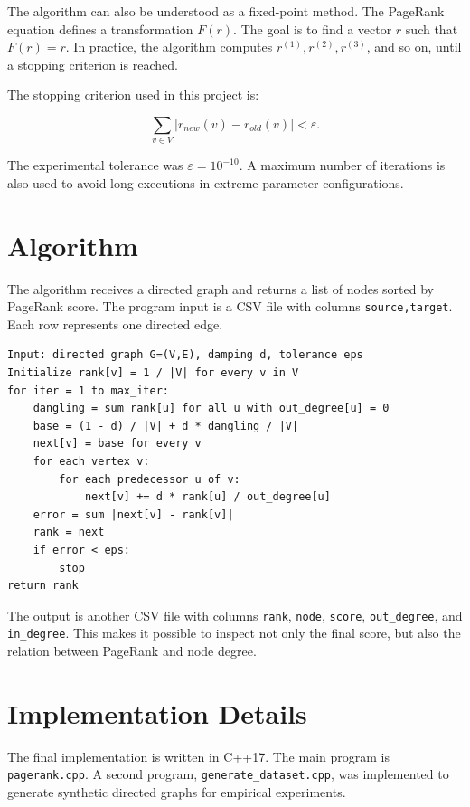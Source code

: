 \documentclass[runningheads]{llncs}
\begin{document}
The algorithm can also be understood as a fixed-point method. The PageRank equation defines a transformation \(F(r)\). The goal is to find a vector \(r\) such that \(F(r)=r\). In practice, the algorithm computes \(r^{(1)}, r^{(2)}, r^{(3)}\), and so on, until a stopping criterion is reached.

The stopping criterion used in this project is:

\begin{equation}
\sum_{v\in V}|r_{new}(v)-r_{old}(v)|<\varepsilon.
\end{equation}

The experimental tolerance was \(\varepsilon=10^{-10}\). A maximum number of iterations is also used to avoid long executions in extreme parameter configurations.

\section{Algorithm}

The algorithm receives a directed graph and returns a list of nodes sorted by PageRank score. The program input is a CSV file with columns \texttt{source,target}. Each row represents one directed edge.

\begin{verbatim}
Input: directed graph G=(V,E), damping d, tolerance eps
Initialize rank[v] = 1 / |V| for every v in V
for iter = 1 to max_iter:
    dangling = sum rank[u] for all u with out_degree[u] = 0
    base = (1 - d) / |V| + d * dangling / |V|
    next[v] = base for every v
    for each vertex v:
        for each predecessor u of v:
            next[v] += d * rank[u] / out_degree[u]
    error = sum |next[v] - rank[v]|
    rank = next
    if error < eps:
        stop
return rank
\end{verbatim}

The output is another CSV file with columns \texttt{rank}, \texttt{node}, \texttt{score}, \texttt{out\_degree}, and \texttt{in\_degree}. This makes it possible to inspect not only the final score, but also the relation between PageRank and node degree.

\section{Implementation Details}

The final implementation is written in C++17. The main program is \texttt{pagerank.cpp}. A second program, \texttt{generate\_dataset.cpp}, was implemented to generate synthetic directed graphs for empirical experiments.
\end{document}
